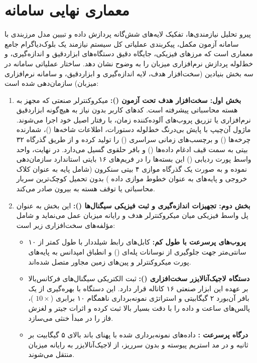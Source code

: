 \section{معماری نهایی سامانه}
\label{sec:final_system_architecture}
پیرو تحلیل نیازمندی‌ها، تفکیک لایه‌های شش‌گانه پردازش داده و تبیین مدل مرزبندی با سامانه آزمون مکمل، پیکربندی عملیاتی کل سیستم نیازمند یک بلوک‌دیاگرام جامع معماری است که مرزهای فیزیکی، جایگاه دقیق دستگاه‌های ابزاردقیق و اندازه‌گیری، و خط‌لوله پردازش نرم‌افزاری میزبان را به وضوح نشان دهد. ساختار عملیاتی سامانه در سه بخش بنیادین (سخت‌افزار هدف، لایه اندازه‌گیری و ابزاردقیق، و سامانه نرم‌افزاری میزبان) سازمان‌دهی شده است:

\begin{enumerate}
    \item \textbf{بخش اول: سخت‌افزار هدف تحت آزمون ():}
    میکروکنترلر صنعتی  که مجهز به هسته محاسباتی پیشرفته  است. کدهای کاربر بدون نیاز به هیچ‌گونه ابزاردقیق نرم‌افزاری یا تزریق پروب‌های آلوده‌کننده زمان، با رفتار اصیل خود اجرا می‌شوند. ماژول آن‌چیپ  با پایش بی‌درنگ خط‌لوله دستورات، اطلاعات شاخه‌ها ()، شمارنده چرخه‌ها () و برچسب‌های زمانی سراسری () را تولید کرده و از طریق گذرگاه ۳۲ بیتی  به سمت قيف ادغام داده‌ها () و بافر حلقوی  گسیل می‌دارد. در نهایت، واحد واسط پورت ردیابی () این بسته‌ها را در فریم‌های ۱۶ بایتی استاندارد سازمان‌دهی نموده و به صورت یک گذرگاه موازی ۴ بیتی سنکرون (شامل پایه  به عنوان کلاک خروجی  و پایه‌های  به عنوان خطوط موازی داده ) بدون تحمیل کوچک‌ترین سربار محاسباتی یا توقف هسته به بیرون صادر می‌کند.

    \item \textbf{بخش دوم: تجهیزات اندازه‌گیری و ثبت فیزیکی سیگنال‌ها ():}
    این بخش به عنوان پل واسط فیزیکی میان میکروکنترلر هدف و رایانه میزبان عمل می‌نماید و شامل مؤلفه‌های سخت‌افزاری زیر است:
    \begin{itemize}
        \item \textbf{پروب‌های پرسرعت با طول کم:} کابل‌های رابط شیلددار با طول کمتر از ۱۰ سانتی‌متر جهت جلوگیری از نوسانات پله‌ای () و انطباق امپدانس به پایه‌های پورت  میکروکنترلر و پین‌های زمین مجاور متصل شده‌اند.
        \item \textbf{دستگاه لاجیک‌آنالایزر سخت‌افزاری ():} ثبت الکتریکی سیگنال‌های فرکانس‌بالا بر عهده این ابزار صنعتی ۱۶ کاناله قرار دارد. این دستگاه با بهره‌گیری از یک بافر آن‌بورد ۲ گیگابیتی  و استراتژی نمونه‌برداری ناهمگام ۱۰ برابری ($10\times$ )، پالس‌های ساعت و داده را با دقت بسیار بالا ثبت کرده و اثرات جیتر و لغزش فاز را در مبدأ خنثی می‌سازد.
        \item \textbf{درگاه پرسرعت :} داده‌های نمونه‌برداری شده با پهنای باند بالای ۵ گیگابیت بر ثانیه و در مد استریم پیوسته و بدون سرریز، از لاجیک‌آنالایزر به رایانه میزبان منتقل می‌شوند.
    \end{itemize}


\end{enumerate}
